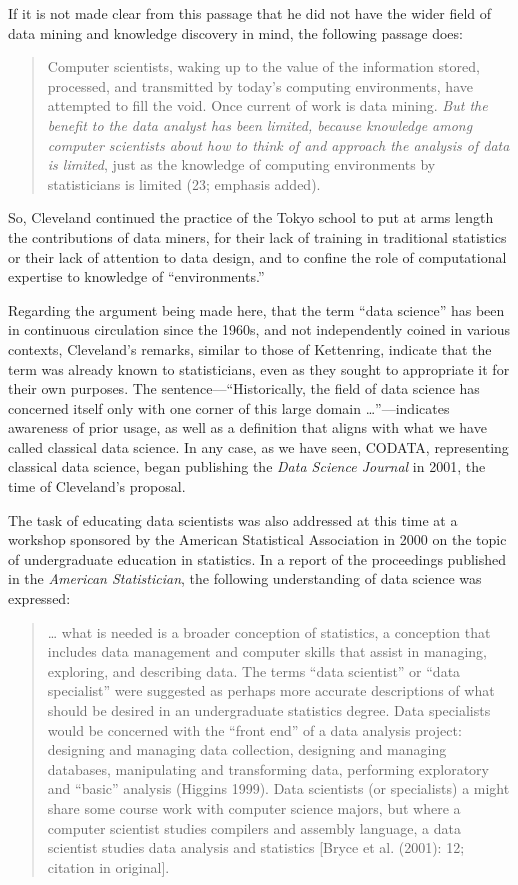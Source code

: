 \documentclass[
  letterpaper,
]{report}
\begin{document}
If it is not made clear from this passage that he did not have the wider
field of data mining and knowledge discovery in mind, the following
passage does:

\begin{quote}
Computer scientists, waking up to the value of the information stored,
processed, and transmitted by today's computing environments, have
attempted to fill the void. Once current of work is data mining.
\emph{But the benefit to the data analyst has been limited, because
knowledge among computer scientists about how to think of and approach
the analysis of data is limited}, just as the knowledge of computing
environments by statisticians is limited (23; emphasis added).
\end{quote}

So, Cleveland continued the practice of the Tokyo school to put at arms
length the contributions of data miners, for their lack of training in
traditional statistics or their lack of attention to data design, and to
confine the role of computational expertise to knowledge of
``environments.''

Regarding the argument being made here, that the term ``data science''
has been in continuous circulation since the 1960s, and not
independently coined in various contexts, Cleveland's remarks, similar
to those of Kettenring, indicate that the term was already known to
statisticians, even as they sought to appropriate it for their own
purposes. The sentence---``Historically, the field of data science has
concerned itself only with one corner of this large domain
\ldots{}''---indicates awareness of prior usage, as well as a definition
that aligns with what we have called classical data science. In any
case, as we have seen, CODATA, representing classical data science,
began publishing the \emph{Data Science Journal} in 2001, the time of
Cleveland's proposal.

The task of educating data scientists was also addressed at this time at
a workshop sponsored by the American Statistical Association in 2000 on
the topic of undergraduate education in statistics. In a report of the
proceedings published in the \emph{American Statistician}, the following
understanding of data science was expressed:

\begin{quote}
\ldots{} what is needed is a broader conception of statistics, a
conception that includes data management and computer skills that assist
in managing, exploring, and describing data. The terms ``data
scientist'' or ``data specialist'' were suggested as perhaps more
accurate descriptions of what should be desired in an undergraduate
statistics degree. Data specialists would be concerned with the ``front
end'' of a data analysis project: designing and managing data
collection, designing and managing databases, manipulating and
transforming data, performing exploratory and ``basic'' analysis
(Higgins 1999). Data scientists (or specialists) a might share some
course work with computer science majors, but where a computer scientist
studies compilers and assembly language, a data scientist studies data
analysis and statistics {[}Bryce et al. (2001): 12; citation in
original{]}.
\end{quote}
\end{document}
